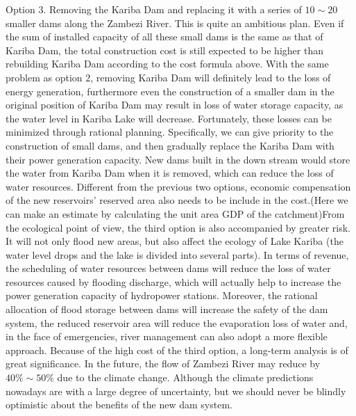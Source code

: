 \documentclass{mcmthesis}
\begin{document}
\indent Option 3. Removing the Kariba Dam and replacing it with a series of $10\sim20$ smaller dams along the Zambezi River. This is quite an ambitious plan. Even if the sum of installed capacity of all these small dams is the same as that of Kariba Dam, the total construction cost is still expected to be higher than rebuilding Kariba Dam according to the cost formula above. With the same problem as option 2, removing Kariba Dam will definitely lead to the loss of energy generation, furthermore even the construction of a smaller dam in the original position of Kariba Dam may result in loss of water storage capacity, as the water level in Kariba Lake will decrease. Fortunately, these losses can be minimized through rational planning. Specifically, we can give priority to the construction of small dams, and then gradually replace the Kariba Dam with their power generation capacity. New dams built in the down stream would store the water from Kariba Dam when it is removed, which can reduce the loss of water resources. Different from the previous two options, economic compensation of the new reservoirs' reserved area also needs to be include in the cost.(Here we can make an estimate by calculating the unit area GDP of the catchment)From the ecological point of view, the third option is also accompanied by greater risk. It will not only flood new areas, but also affect the ecology of Lake Kariba (the water level drops and the lake is divided into several parts). In terms of revenue, the scheduling of water resources between dams will reduce the loss of water resources caused by flooding discharge, which will actually help to increase the power generation capacity of hydropower stations. Moreover, the rational allocation of flood storage between dams will increase the safety of the dam system, the reduced reservoir area will reduce the evaporation loss of water and, in the face of emergencies, river management can also adopt a more flexible approach. Because of the high cost of the third option, a long-term analysis is of great significance. In the future, the flow of Zambezi River may reduce by $40\%\sim50\%$ due to the climate change. Although the climate predictions nowadays are with a large degree of uncertainty, but we should never be blindly optimistic about the benefits of the new dam system.\\





\end{document}
